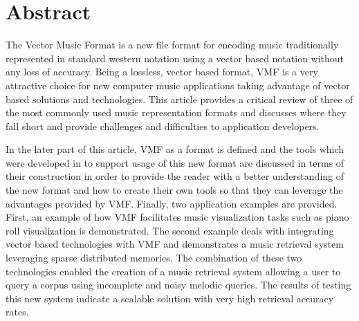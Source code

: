 
\section*{Abstract}
The Vector Music Format is a new file format for encoding music traditionally represented in standard western notation using a vector based notation without any loss of accuracy. Being a lossless, vector based format, VMF is a very attractive choice for new computer music applications taking advantage of vector based solutions and technologies. This article provides a critical review of three of the most commonly used music representation formats and discusses where they fall short and provide challenges and difficulties to application developers.

In the later part of this article, VMF as a format is defined and the tools which were developed in to support usage of this new format are discussed in terms of their construction in order to provide the reader with a better understanding of the new format and how to create their own tools so that they can leverage the advantages provided by VMF. Finally, two application examples are provided. First, an example of how VMF facilitates music visualization tasks such as piano roll visualization is demonstrated. The second example deals with integrating vector based technologies with VMF and demonstrates a music retrieval system leveraging sparse distributed memories. The combination of these two technologies enabled the creation of a music retrieval system allowing a user to query a corpus using incomplete and noisy melodic queries. The results of testing this new system indicate a scalable solution with very high retrieval accuracy rates.